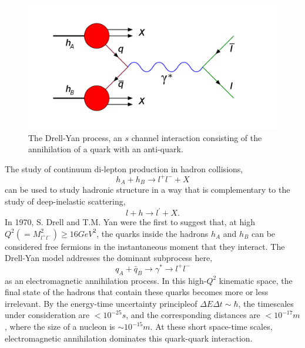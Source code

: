 \begin{figure}[h]
	\centering
	\includegraphics[width=5.0in]{figures/background/Drell-Yan.png}
	\caption{The Drell-Yan process, an $s$ channel interaction consisting of the annihilation of a quark with an anti-quark.}
	\label{fig:dy-diagram}
\end{figure}

The study of continuum di-lepton production in hadron collisions,
\begin{equation}
	h_A +  h_B \rightarrow l^+ l^- + X
	\label{eq:hh2ll}
\end{equation} 
can be used to study hadronic structure in a way that is complementary to the study of deep-inelastic scattering,
\begin{equation}
l + h \rightarrow l^\prime + X.
\label{eq:lh2lx}
\end{equation}
In 1970, S. Drell and T.M. Yan were the first to suggest that, at high $Q^2 (=M^2_{l^+ l^-}) \geq 16GeV^2$, the quarks inside the hadrons $h_A$ and $h_B$ can be considered free fermions in the instantaneous moment that they interact. The Drell-Yan model addresses the dominant subprocess here,
\begin{equation}
q_A + \bar{q}_B \rightarrow \gamma^* \rightarrow l^+ l^-
\label{eq:dy-process}
\end{equation} 
as an electromagnetic annihilation process. In this high-$Q^2$ kinematic space, the final state of the hadrons that contain these quarks becomes more or less irrelevant. By the energy-time uncertainty principle\CN of $\Delta E \Delta t \sim \hbar$, the timescales under consideration are $<10^{-25}s$, and the corresponding distances are $<10^{-17}m$, where the size of a nucleon is $\sim 10^{-15}m$\CN. At these short space-time scales, electromagnetic annihilation dominates this quark-quark interaction.

